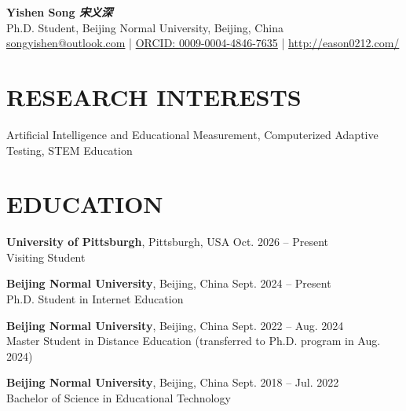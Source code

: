 \documentclass[a4paper,9pt]{extarticle}
\begin{document}
\pagestyle{fancy}
\renewcommand{\headrulewidth}{0pt}
\fancyhead{}
\pagestyle{empty} %

\begin{flushleft}
\textbf{\LARGE Yishen Song \textit{宋义深}}\\[2pt] %
Ph.D. Student, Beijing Normal University, Beijing, China
\\ \href{mailto:songyishen@outlook.com}{songyishen@outlook.com} | \href{https://orcid.org/0009-0004-4846-7635}{ORCID: 0009-0004-4846-7635} | \href{http://eason010212.github.io/homepage/}{http://eason0212.com/}
\end{flushleft}

\section*{RESEARCH INTERESTS}
\noindent
Artificial Intelligence and Educational Measurement, Computerized Adaptive Testing, STEM Education

\section*{EDUCATION}
\noindent
\textbf{University of Pittsburgh}, Pittsburgh, USA \hfill Oct. 2026 – Present  \\ %
Visiting Student

\noindent
\textbf{Beijing Normal University}, Beijing, China \hfill Sept. 2024 – Present  \\ %
Ph.D. Student in Internet Education 

\noindent
\textbf{Beijing Normal University}, Beijing, China \hfill Sept. 2022 – Aug. 2024  \\ %
Master Student in Distance Education (transferred to Ph.D. program in Aug. 2024)

\noindent
\textbf{Beijing Normal University},  Beijing, China \hfill Sept. 2018 – Jul. 2022\\ %
Bachelor of Science in Educational Technology  %
\end{document}
